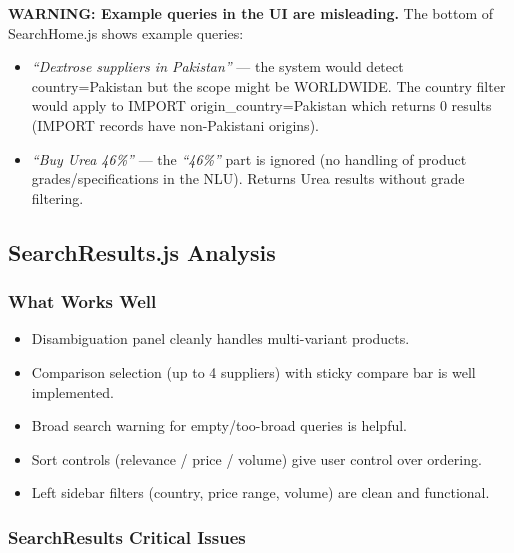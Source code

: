 \documentclass[12pt,a4paper]{article}
\begin{document}
\begin{warnBox}
\textbf{WARNING: Example queries in the UI are misleading.}
The bottom of SearchHome.js shows example queries:
\begin{itemize}
  \item \textit{``Dextrose suppliers in Pakistan''} --- the system would detect country=Pakistan but
        the scope might be WORLDWIDE. The country filter would apply to IMPORT origin\_country=Pakistan
        which returns 0 results (IMPORT records have non-Pakistani origins).
  \item \textit{``Buy Urea 46\%''} --- the \textit{``46\%''} part is ignored (no handling of
        product grades/specifications in the NLU). Returns Urea results without grade filtering.
\end{itemize}
\end{warnBox}

\subsection{SearchResults.js Analysis}

\subsubsection{What Works Well}

\begin{okBox}
\begin{itemize}
  \item Disambiguation panel cleanly handles multi-variant products.
  \item Comparison selection (up to 4 suppliers) with sticky compare bar is well implemented.
  \item Broad search warning for empty/too-broad queries is helpful.
  \item Sort controls (relevance / price / volume) give user control over ordering.
  \item Left sidebar filters (country, price range, volume) are clean and functional.
\end{itemize}
\end{okBox}

\subsubsection{SearchResults Critical Issues}
\end{document}
